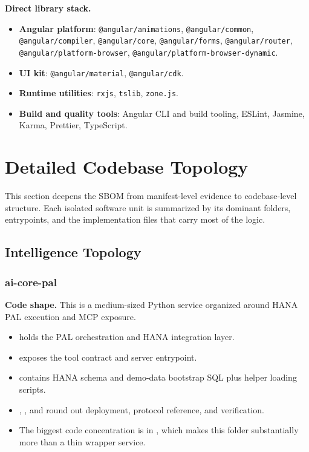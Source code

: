 \documentclass[11pt,a4paper]{article}
\begin{document}
\textbf{Direct library stack.}
\begin{itemize}[leftmargin=*]
    \item \textbf{Angular platform}: \texttt{@angular/animations}, \texttt{@angular/common}, \texttt{@angular/compiler}, \texttt{@angular/core}, \texttt{@angular/forms}, \texttt{@angular/router}, \texttt{@angular/platform-browser}, \texttt{@angular/platform-browser-dynamic}.
    \item \textbf{UI kit}: \texttt{@angular/material}, \texttt{@angular/cdk}.
    \item \textbf{Runtime utilities}: \texttt{rxjs}, \texttt{tslib}, \texttt{zone.js}.
    \item \textbf{Build and quality tools}: Angular CLI and build tooling, ESLint, Jasmine, Karma, Prettier, TypeScript.
\end{itemize}

\newpage
\section{Detailed Codebase Topology}

This section deepens the SBOM from manifest-level evidence to codebase-level structure. Each isolated software unit is summarized by its dominant folders, entrypoints, and the implementation files that carry most of the logic.

\subsection{Intelligence Topology}

\subsubsection{ai-core-pal}

\textbf{Code shape.} This is a medium-sized Python service organized around HANA PAL execution and MCP exposure.
\begin{itemize}[leftmargin=*]
    \item {} holds the PAL orchestration and HANA integration layer.
    \item {} exposes the tool contract and server entrypoint.
    \item {} contains HANA schema and demo-data bootstrap SQL plus helper loading scripts.
    \item {}, , and  round out deployment, protocol reference, and verification.
    \item The biggest code concentration is in , which makes this folder substantially more than a thin wrapper service.
\end{itemize}
\end{document}
